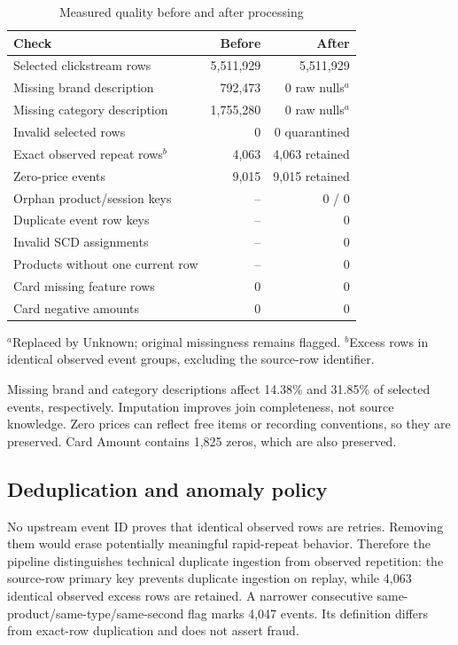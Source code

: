 \documentclass[conference]{IEEEtran}
\begin{document}
\begin{table}[t]\centering\caption{Measured quality before and after processing}\label{tab:quality}\small
\begin{tabular}{p{}rr}\toprule
Check & Before & After\\\midrule
Selected clickstream rows & 5,511,929 & 5,511,929\\
Missing brand description & 792,473 & 0 raw nulls$^a$\\
Missing category description & 1,755,280 & 0 raw nulls$^a$\\
Invalid selected rows & 0 & 0 quarantined\\
Exact observed repeat rows$^b$ & 4,063 & 4,063 retained\\
Zero-price events & 9,015 & 9,015 retained\\
Orphan product/session keys & -- & 0 / 0\\
Duplicate event row keys & -- & 0\\
Invalid SCD assignments & -- & 0\\
Products without one current row & -- & 0\\
Card missing feature rows & 0 & 0\\
Card negative amounts & 0 & 0\\\bottomrule
\end{tabular}
\begin{flushleft}\scriptsize $^a$Replaced by Unknown; original missingness remains flagged. $^b$Excess rows in identical observed event groups, excluding the source-row identifier.\end{flushleft}\end{table}
Missing brand and category descriptions affect 14.38\% and 31.85\% of selected events, respectively. Imputation improves join completeness, not source knowledge. Zero prices can reflect free items or recording conventions, so they are preserved. Card Amount contains 1,825 zeros, which are also preserved.

\subsection{Deduplication and anomaly policy}
No upstream event ID proves that identical observed rows are retries. Removing them would erase potentially meaningful rapid-repeat behavior. Therefore the pipeline distinguishes technical duplicate ingestion from observed repetition: the source-row primary key prevents duplicate ingestion on replay, while 4,063 identical observed excess rows are retained. A narrower consecutive same-product/same-type/same-second flag marks 4,047 events. Its definition differs from exact-row duplication and does not assert fraud.
\end{document}
